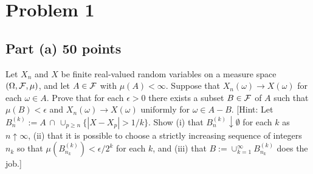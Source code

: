 \documentclass[letterpaper, 12pt]{article}
\newcommand{\Fc}{{\cal F}}
\begin{document}
\pagebreak

\section*{Problem 1}
\subsection*{Part (a) 50 points}

Let $X_n$ and $X$ be finite real-valued random variables on a
measure space $(\Omega, \Fc, \mu)$, and let $A \in \Fc$ with $\mu(A) <
\infty$.  Suppose that $X_n(\omega) \to X(\omega)$ for each $\omega \in A$. 
Prove that for each $\epsilon > 0$ there exists a subset $B \in \Fc$ of $A$
such that $\mu(B) < \epsilon$ and $X_n(\omega) \to X(\omega)$ uniformly for
$\omega \in A - B$.  [{\sc Hint:} Let $B_n^{(k)} := A\,\cap\,\cup_{p \geq n} 
\{|X - X_p| > 1/k\}$.  Show (i) that $B_n^{(k)} \downarrow \emptyset$ 
for each $k$ as
$n \uparrow \infty$, (ii) that it is possible to choose a strictly increasing
sequence of integers $n_k$ so that $\mu(B_{n_k}^{(k)}) < \epsilon/2^k$ for each
$k$, and (iii) that $B := \cup_{k=1}^{\infty} B_{n_k}^{(k)}$ does the job.]
\end{document}
